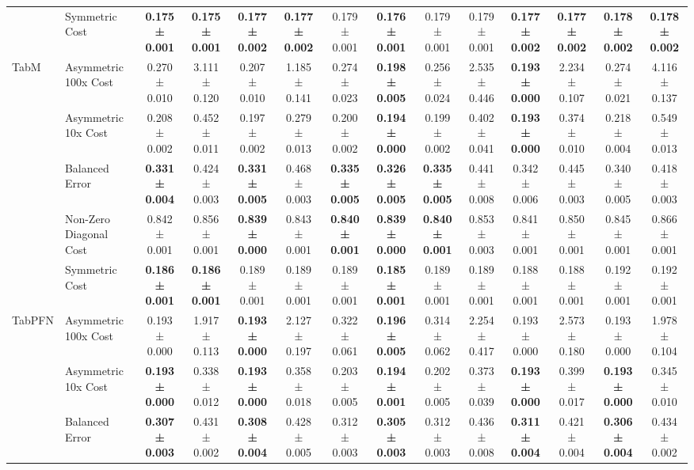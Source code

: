 \begin{table}[H]
{\begin{tabular}{llcccccccccccc}
 & Symmetric Cost & \textbf{0.175 ± 0.001} & \textbf{0.175 ± 0.001} & \textbf{0.177 ± 0.002} & \textbf{0.177 ± 0.002} & 0.179 ± 0.001 & \textbf{0.176 ± 0.001} & 0.179 ± 0.001 & 0.179 ± 0.001 & \textbf{0.177 ± 0.002} & \textbf{0.177 ± 0.002} & \textbf{0.178 ± 0.002} & \textbf{0.178 ± 0.002} \\
\cline{1-14}
\multirow[t]{5}{*}{TabM} & Asymmetric 100x Cost & 0.270 ± 0.010 & 3.111 ± 0.120 & 0.207 ± 0.010 & 1.185 ± 0.141 & 0.274 ± 0.023 & \textbf{0.198 ± 0.005} & 0.256 ± 0.024 & 2.535 ± 0.446 & \textbf{0.193 ± 0.000} & 2.234 ± 0.107 & 0.274 ± 0.021 & 4.116 ± 0.137 \\
 & Asymmetric 10x Cost & 0.208 ± 0.002 & 0.452 ± 0.011 & 0.197 ± 0.002 & 0.279 ± 0.013 & 0.200 ± 0.002 & \textbf{0.194 ± 0.000} & 0.199 ± 0.002 & 0.402 ± 0.041 & \textbf{0.193 ± 0.000} & 0.374 ± 0.010 & 0.218 ± 0.004 & 0.549 ± 0.013 \\
 & Balanced Error & \textbf{0.331 ± 0.004} & 0.424 ± 0.003 & \textbf{0.331 ± 0.005} & 0.468 ± 0.003 & \textbf{0.335 ± 0.005} & \textbf{0.326 ± 0.005} & \textbf{0.335 ± 0.005} & 0.441 ± 0.008 & 0.342 ± 0.006 & 0.445 ± 0.003 & 0.340 ± 0.005 & 0.418 ± 0.003 \\
 & Non-Zero Diagonal Cost & 0.842 ± 0.001 & 0.856 ± 0.001 & \textbf{0.839 ± 0.000} & 0.843 ± 0.001 & \textbf{0.840 ± 0.001} & \textbf{0.839 ± 0.000} & \textbf{0.840 ± 0.001} & 0.853 ± 0.003 & 0.841 ± 0.001 & 0.850 ± 0.001 & 0.845 ± 0.001 & 0.866 ± 0.001 \\
 & Symmetric Cost & \textbf{0.186 ± 0.001} & \textbf{0.186 ± 0.001} & 0.189 ± 0.001 & 0.189 ± 0.001 & 0.189 ± 0.001 & \textbf{0.185 ± 0.001} & 0.189 ± 0.001 & 0.189 ± 0.001 & 0.188 ± 0.001 & 0.188 ± 0.001 & 0.192 ± 0.001 & 0.192 ± 0.001 \\
\cline{1-14}
\multirow[t]{5}{*}{TabPFN} & Asymmetric 100x Cost & 0.193 ± 0.000 & 1.917 ± 0.113 & \textbf{0.193 ± 0.000} & 2.127 ± 0.197 & 0.322 ± 0.061 & \textbf{0.196 ± 0.005} & 0.314 ± 0.062 & 2.254 ± 0.417 & 0.193 ± 0.000 & 2.573 ± 0.180 & 0.193 ± 0.000 & 1.978 ± 0.104 \\
 & Asymmetric 10x Cost & \textbf{0.193 ± 0.000} & 0.338 ± 0.012 & \textbf{0.193 ± 0.000} & 0.358 ± 0.018 & 0.203 ± 0.005 & \textbf{0.194 ± 0.001} & 0.202 ± 0.005 & 0.373 ± 0.039 & \textbf{0.193 ± 0.000} & 0.399 ± 0.017 & \textbf{0.193 ± 0.000} & 0.345 ± 0.010 \\
 & Balanced Error & \textbf{0.307 ± 0.003} & 0.431 ± 0.002 & \textbf{0.308 ± 0.004} & 0.428 ± 0.005 & 0.312 ± 0.003 & \textbf{0.305 ± 0.003} & 0.312 ± 0.003 & 0.436 ± 0.008 & \textbf{0.311 ± 0.004} & 0.421 ± 0.004 & \textbf{0.306 ± 0.004} & 0.434 ± 0.002 \\

\end{tabular}}
\end{table}
